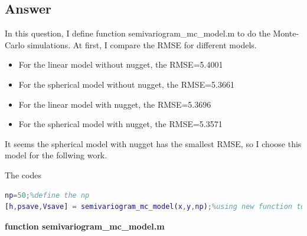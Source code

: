 \documentclass[
	12pt, %
]{fphw}
\begin{document}
\subsection*{Answer}

In this question, I define function semivariogram\_mc\_model.m to do the Monte-Carlo simulations. At first, I compare the RMSE for different models. 

\begin{itemize}
	\item For the linear model without nugget, the RMSE=5.4001
	\item For the spherical model without nugget, the RMSE=5.3661
	\item For the linear model with nugget, the RMSE=5.3696
	\item For the spherical model with nugget, the RMSE=5.3571
\end{itemize}

It seems the spherical model with nugget has the smallest RMSE, so I choose this model for the follwing work.




The codes

\begin{lstlisting}[language=Matlab,escapeinside=``]
%choose the spherical model with nugget which has smallest RMSE
np=50;%define the np
[h,psave,Vsave] = semivariogram_mc_model(x,y,np);%using new function to obtain the best parameters and variogram results
\end{lstlisting}

\textbf{function semivariogram\_mc\_model.m}
                                                                                                                        
\end{document}
